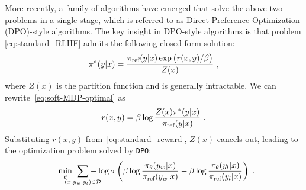 More recently, a family of algorithms have emerged that solve the above two problems in a single stage, which is referred to as Direct Preference Optimization (DPO)-style algorithms. The key insight in DPO-style algorithms is that problem \eqref{eq:standard_RLHF} admits the following closed-form solution:
%
\begin{equation}
\pi^*(y | x) = \frac{\pi_{\textrm{ref}}(y | x)\exp\big(r(x,y)/\beta\big)}{Z(x)}\ ,
\label{eq:soft-MDP-optimal}
\end{equation}
%
where $Z(x)$ is the partition function and is generally intractable. We can rewrite~\eqref{eq:soft-MDP-optimal} as
%
\begin{equation} \label{eq:standard_reward}
r(x,y) = \beta\log \frac{Z(x)\pi^{*}(y | x)}{\pi_{\textrm{ref}}(y | x)}\ .
\end{equation}
%
Substituting $r(x,y)$ from~\eqref{eq:standard_reward}, $Z(x)$ cancels out, leading to the optimization problem solved by \texttt{DPO}:
%
\begin{equation} \label{eq:DPO}
\min_{\theta} \hspace{-0.15in}\sum_{(x, y_w, y_l) \in \mathcal{D}} \hspace{-0.2in}-\log \sigma\left(\beta\log \frac{\pi_{\theta}(y_w | x)}{\piRef(y_w | x)} - \beta\log \frac{\pi_{\theta}(y_l | x)}{\piRef(y_l | x)}\right)\;. 
\hspace{-0.1in}
\end{equation}
